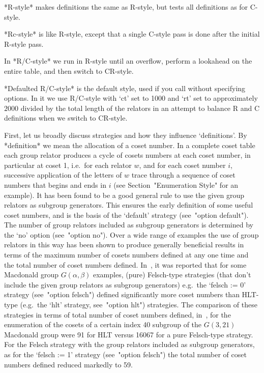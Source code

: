 *R\*-style* makes definitions the  same
as R-style, but tests all definitions as for C-style.

*Rc-style* is like R-style, except that a
single C-style pass is done after the initial R-style pass.

In *R/C-style* we run in R-style  until
an overflow, perform a lookahead on the entire table, and then  switch
to CR-style.

*Defaulted     R/C-style* is the default style,  used  if  you  call  {\ACE}  without
specifying options. In it we use R/C-style with `ct' set to  1000  and
`rt' set to approximately $2000$ divided by the total  length  of  the
relators in an attempt to balance R and C definitions when  we  switch
to CR-style.


First, let us  broadly  discuss  strategies  and  how  they  influence
\lq{}definitions'.  By  *definition*  we  mean   the
allocation of a coset number. In a complete  coset  table  each  group
relator produces a cycle of cosets numbers at each  coset  number,  in
particular at coset 1, i.e.~for each relator $w$, and for  each  coset
number $i$, successive application of the letters of $w$ trace through
a sequence  of  coset  numbers  that  begins  and  ends  in  $i$  (see
Section~"Enumeration Style" for an example). It has been found to be a
good general  rule  to  use  the  given  group  relators  as  subgroup
generators. This ensures the early definition  of  some  useful  coset
numbers, and is the  basis  of  the  `default'  strategy  (see~"option
default").  The  number  of  group  relators  included   as   subgroup
generators is determined by the `no' option (see~"option no"). Over  a
wide range of examples the use of group relators in this way has  been
shown to produce generally beneficial results in terms of the  maximum
number of cosets numbers defined at any one time and the total  number
of coset numbers defined. In~\cite{CDHW73}, it was reported  that  for
some Macdonald group $G(\alpha,\beta)$  examples,  (pure)  Felsch-type
strategies (that don't include the given group  relators  as  subgroup
generators) e.g.~the `felsch  :=  0'  strategy  (see~"option  felsch")
defined significantly more coset numbers than HLT-type (e.g.~the `hlt'
strategy,  see~"option  hlt")  strategies.  The  comparison  of  these
strategies  in  terms  of  total  number  of  coset  numbers  defined,
in~\cite{Hav91}, for the enumeration of the cosets of a certain  index
40 subgroup of the $G(3,21)$ Macdonald group were 91  for  HLT  versus
16067 for a pure Felsch-type strategy. For the  Felsch  strategy  with
the group relators included as subgroup generators, as for the `felsch
:= 1' strategy (see~"option felsch") the total number of coset numbers
defined reduced markedly to 59.

